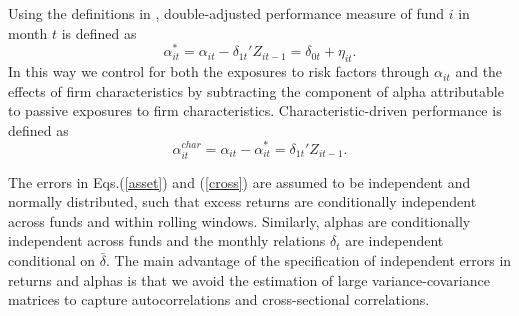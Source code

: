 Using the definitions in \citet{busse2017double}, double-adjusted performance measure of fund $i$ in month $t$ is defined as 
\begin{equation}
\label{double_adjusted_alpha}
     \alpha^*_{it} = \alpha_{it} - \delta_{1t}'Z_{it-1} = \delta_{0t} + \eta_{it}. 
\end{equation}
In this way we control for both the exposures to risk factors through $\alpha_{it}$ and the effects of firm characteristics by subtracting the component of alpha attributable to passive exposures to firm characteristics. Characteristic-driven performance is defined as
\begin{equation}
\label{char}
    \alpha^{char}_{it} = \alpha_{it} - \alpha^*_{it} = \delta_{1t}'Z_{it-1}.
\end{equation}

The errors in Eqs.(\ref{asset}) and (\ref{cross}) are assumed to be independent and normally distributed, such that excess returns are conditionally independent across funds and within rolling windows. Similarly, alphas are conditionally independent across funds and the monthly relations $\delta_t$ are independent conditional on $\bar{\delta}$. The main advantage of the specification of independent errors in returns and alphas is that we avoid the estimation of large variance-covariance matrices to capture autocorrelations and cross-sectional correlations.

